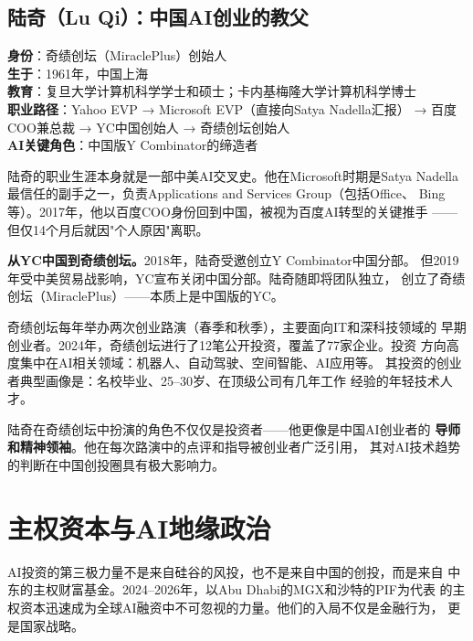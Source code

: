 \subsection{陆奇（Lu Qi）：中国AI创业的教父}
\label{subsec:inv-luqi}

\begin{corebox}[人物档案：陆奇（Lu Qi）]
\textbf{身份}：奇绩创坛（MiraclePlus）创始人 \\
\textbf{生于}：1961年，中国上海 \\
\textbf{教育}：复旦大学计算机科学学士和硕士；卡内基梅隆大学计算机科学博士 \\
\textbf{职业路径}：Yahoo EVP → Microsoft EVP（直接向Satya Nadella汇报）
  → 百度COO兼总裁 → YC中国创始人 → 奇绩创坛创始人 \\
\textbf{AI关键角色}：中国版Y Combinator的缔造者
\end{corebox}

陆奇的职业生涯本身就是一部中美AI交叉史。他在Microsoft时期是Satya
Nadella最信任的副手之一，负责Applications and Services Group（包括Office、
Bing等）。2017年，他以百度COO身份回到中国，被视为百度AI转型的关键推手
——但仅14个月后就因"个人原因"离职。

\textbf{从YC中国到奇绩创坛。}2018年，陆奇受邀创立Y Combinator中国分部。
但2019年受中美贸易战影响，YC宣布关闭中国分部。陆奇随即将团队独立，
创立了奇绩创坛（MiraclePlus）——本质上是中国版的YC。

奇绩创坛每年举办两次创业路演（春季和秋季），主要面向IT和深科技领域的
早期创业者。2024年，奇绩创坛进行了12笔公开投资，覆盖了77家企业。投资
方向高度集中在AI相关领域：机器人、自动驾驶、空间智能、AI应用等。
其投资的创业者典型画像是：名校毕业、25--30岁、在顶级公司有几年工作
经验的年轻技术人才。

陆奇在奇绩创坛中扮演的角色不仅仅是投资者——他更像是中国AI创业者的
\textbf{导师和精神领袖}。他在每次路演中的点评和指导被创业者广泛引用，
其对AI技术趋势的判断在中国创投圈具有极大影响力。


\section{主权资本与AI地缘政治}
\label{sec:inv-sovereign}

AI投资的第三极力量不是来自硅谷的风投，也不是来自中国的创投，而是来自
中东的主权财富基金。2024--2026年，以Abu Dhabi的MGX和沙特的PIF为代表
的主权资本迅速成为全球AI融资中不可忽视的力量。他们的入局不仅是金融行为，
更是国家战略。

